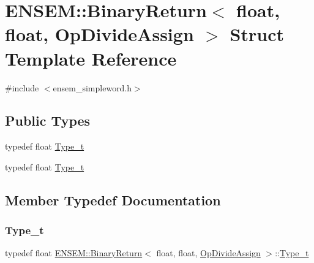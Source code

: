 \hypertarget{structENSEM_1_1BinaryReturn_3_01float_00_01float_00_01OpDivideAssign_01_4}{}\section{E\+N\+S\+EM\+:\+:Binary\+Return$<$ float, float, Op\+Divide\+Assign $>$ Struct Template Reference}
\label{structENSEM_1_1BinaryReturn_3_01float_00_01float_00_01OpDivideAssign_01_4}


{\ttfamily \#include $<$ensem\+\_\+simpleword.\+h$>$}

\subsection*{Public Types}
\begin{DoxyCompactItemize}
\item 
typedef float \mbox{\hyperlink{structENSEM_1_1BinaryReturn_3_01float_00_01float_00_01OpDivideAssign_01_4_a9343566dc5cdc2470343502c7d2affe5}{Type\+\_\+t}}
\item 
typedef float \mbox{\hyperlink{structENSEM_1_1BinaryReturn_3_01float_00_01float_00_01OpDivideAssign_01_4_a9343566dc5cdc2470343502c7d2affe5}{Type\+\_\+t}}
\end{DoxyCompactItemize}


\subsection{Member Typedef Documentation}
\mbox{\label{structENSEM_1_1BinaryReturn_3_01float_00_01float_00_01OpDivideAssign_01_4_a9343566dc5cdc2470343502c7d2affe5}} 
\subsubsection{\texorpdfstring{Type\_t}{Type\_t}\hspace{0.1cm}{\footnotesize\ttfamily [1/2]}}
{\footnotesize\ttfamily typedef float \mbox{\hyperlink{structENSEM_1_1BinaryReturn}{E\+N\+S\+E\+M\+::\+Binary\+Return}}$<$ float, float, \mbox{\hyperlink{structENSEM_1_1OpDivideAssign}{Op\+Divide\+Assign}} $>$\+::\mbox{\hyperlink{structENSEM_1_1BinaryReturn_3_01float_00_01float_00_01OpDivideAssign_01_4_a9343566dc5cdc2470343502c7d2affe5}{Type\+\_\+t}}}

